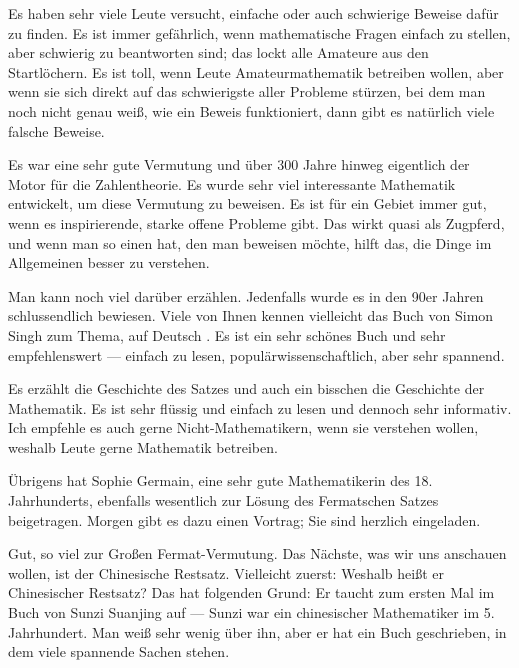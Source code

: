 \begin{spoken-clean}[00:56:17 - 00:58:43]
Es haben sehr viele Leute versucht, einfache oder auch schwierige Beweise dafür zu finden. Es ist immer gefährlich, wenn mathematische Fragen einfach zu stellen, aber schwierig zu beantworten sind; das lockt alle Amateure aus den Startlöchern. Es ist toll, wenn Leute Amateurmathematik betreiben wollen, aber wenn sie sich direkt auf das schwierigste aller Probleme stürzen, bei dem man noch nicht genau weiß, wie ein Beweis funktioniert, dann gibt es natürlich viele falsche Beweise.

Es war eine sehr gute Vermutung und über $300$ Jahre hinweg eigentlich der Motor für die Zahlentheorie. Es wurde sehr viel interessante Mathematik entwickelt, um diese Vermutung zu beweisen. Es ist für ein Gebiet immer gut, wenn es inspirierende, starke offene Probleme gibt. Das wirkt quasi als Zugpferd, und wenn man so einen  hat, den man beweisen möchte, hilft das, die Dinge im Allgemeinen besser zu verstehen.

Man kann noch viel darüber erzählen. Jedenfalls wurde es in den 90er Jahren schlussendlich bewiesen. Viele von Ihnen kennen vielleicht das Buch von Simon Singh zum Thema, auf Deutsch . Es ist ein sehr schönes Buch und sehr empfehlenswert --- einfach zu lesen, populärwissenschaftlich, aber sehr spannend.
\end{spoken-clean}

\begin{spoken-clean}[00:58:43 - 01:01:09]
Es erzählt die Geschichte des Satzes und auch ein bisschen die Geschichte der Mathematik. Es ist sehr flüssig und einfach zu lesen und dennoch sehr informativ. Ich empfehle es auch gerne Nicht-Mathematikern, wenn sie verstehen wollen, weshalb Leute gerne Mathematik betreiben.

Übrigens hat Sophie Germain, eine sehr gute Mathematikerin des 18. Jahrhunderts, ebenfalls wesentlich zur Lösung des Fermatschen Satzes beigetragen. Morgen gibt es dazu einen Vortrag; Sie sind herzlich eingeladen.

Gut, so viel zur Großen Fermat-Vermutung. Das Nächste, was wir uns anschauen wollen, ist der Chinesische Restsatz.  Vielleicht zuerst: Weshalb heißt er Chinesischer Restsatz? Das hat folgenden Grund: Er taucht zum ersten Mal im Buch von Sunzi Suanjing auf --- Sunzi war ein chinesischer Mathematiker im 5. Jahrhundert. Man weiß sehr wenig über ihn, aber er hat ein Buch geschrieben, in dem viele spannende Sachen stehen.
\end{spoken-clean}

